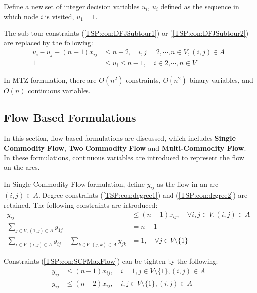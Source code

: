             Define a new set of integer decision variables $u_i$, $u_i$ defined as the sequence in which node $i$ is visited, $u_1 = 1$.

            The sub-tour constraints (\ref{TSP:con:DFJSubtour1}) or (\ref{TSP:con:DFJSubtour2}) are replaced by the following:
            \begin{align}
                u_i - u_j + (n - 1) x_{ij} &\le n - 2, \quad i, j = 2, \cdots, n \in V, (i, j) \in A \label{TSP:con:MTZ1}\\
                1 & \le u_i \le n - 1, \quad i \in 2, \cdots, n \in V \label{TSP:con:MTZ2}
            \end{align}

            In MTZ formulation, there are $O(n^2)$ constraints, $O(n^2)$ binary variables, and $O(n)$ continuous variables.

        \subsection{Flow Based Formulations}
            In this section, flow based formulations are discussed, which includes \textbf{Single Commodity Flow}, \textbf{Two Commodity Flow} and \textbf{Multi-Commodity Flow}. In these formulations, continuous variables are introduced to represent the flow on the arcs.

            In Single Commodity Flow formulation, define $y_{ij}$ as the flow in an arc $(i, j) \in A$. Degree constraints (\ref{TSP:con:degree1}) and (\ref{TSP:con:degree2}) are retained. The following constraints are introduced:
            \begin{align}
                y_{ij} & \le (n - 1) x_{ij}, \quad \forall i, j \in V, (i, j) \in A \label{TSP:con:SCFMaxFlow}\\
                \sum_{j \in V, (1, j) \in A} y_{1j} & = n - 1 \label{TSP:con:SCFInitFlow} \\
                \sum_{i \in V, (i, j) \in A} y_{ij} - \sum_{k \in V, (j, k) \in A} y_{jk} &= 1, \quad \forall j \in V \setminus \{1\} \label{TSP:con:SCFFlowBalance}
            \end{align}

            Constraints (\ref{TSP:con:SCFMaxFlow}) can be tighten by the following:
            \begin{align}
                y_{ij} &\le (n - 1) x_{ij}, \quad i = 1, j \in V \setminus \{1\}, (i, j) \in A \label{TSP:con:SCMMaxFlow1} \\
                y_{ij} &\le (n - 2) x_{ij}, \quad i, j \in V \setminus \{1\}, (i, j) \in A \label{TSP:con:SCMMaxFlow2}
            \end{align}

